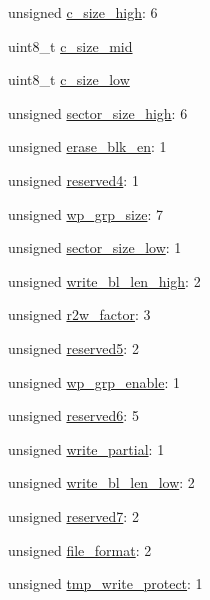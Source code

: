 \begin{DoxyCompactItemize}
\item 
unsigned \hyperlink{struct_c_s_d_v2_a3bfb96cd3f44af64691bc12fbdaf6bbd}{c\+\_\+size\+\_\+high}\+: 6
\item 
uint8\+\_\+t \hyperlink{struct_c_s_d_v2_a7f5abf62601418f93bf7db3e4c44cf17}{c\+\_\+size\+\_\+mid}
\item 
uint8\+\_\+t \hyperlink{struct_c_s_d_v2_aa3717fe7ec52d0336e3729144c15ca3d}{c\+\_\+size\+\_\+low}
\item 
unsigned \hyperlink{struct_c_s_d_v2_aa8630e4c75cd434e0db43b1644b028b4}{sector\+\_\+size\+\_\+high}\+: 6
\item 
unsigned \hyperlink{struct_c_s_d_v2_abd116d457efa09f91c5fad2536718299}{erase\+\_\+blk\+\_\+en}\+: 1
\item 
unsigned \hyperlink{struct_c_s_d_v2_a4f474cd2339283c9a2224eb1259c8e53}{reserved4}\+: 1
\item 
unsigned \hyperlink{struct_c_s_d_v2_afc375bf41f2bffcea61b4a26e95a259a}{wp\+\_\+grp\+\_\+size}\+: 7
\item 
unsigned \hyperlink{struct_c_s_d_v2_a4fbf01ce65824823473004d8507a9682}{sector\+\_\+size\+\_\+low}\+: 1
\item 
unsigned \hyperlink{struct_c_s_d_v2_aa2b4a19a9ee6671b3441636868d2559e}{write\+\_\+bl\+\_\+len\+\_\+high}\+: 2
\item 
unsigned \hyperlink{struct_c_s_d_v2_a58bd5e31a21564370b5321ce744c53cf}{r2w\+\_\+factor}\+: 3
\item 
unsigned \hyperlink{struct_c_s_d_v2_a6beffc3766b7f6cd658e3dad5b7e12f7}{reserved5}\+: 2
\item 
unsigned \hyperlink{struct_c_s_d_v2_a17bbbfe5a1d0da01eeb9dc0e78d1fccc}{wp\+\_\+grp\+\_\+enable}\+: 1
\item 
unsigned \hyperlink{struct_c_s_d_v2_ac401478963e75077602ad0ca9f93c98a}{reserved6}\+: 5
\item 
unsigned \hyperlink{struct_c_s_d_v2_a5bdeb28b6b264d0da4d881881d135c7a}{write\+\_\+partial}\+: 1
\item 
unsigned \hyperlink{struct_c_s_d_v2_a5455039cfbcd62d47d8777326a8332d5}{write\+\_\+bl\+\_\+len\+\_\+low}\+: 2
\item 
unsigned \hyperlink{struct_c_s_d_v2_a10ae8595e043b636b4aeaedcefaa4f97}{reserved7}\+: 2
\item 
unsigned \hyperlink{struct_c_s_d_v2_ac1c316bc9b54c269007fb8e29f635508}{file\+\_\+format}\+: 2
\item 
unsigned \hyperlink{struct_c_s_d_v2_a15af35048d759ff86290222b7ce8e217}{tmp\+\_\+write\+\_\+protect}\+: 1

\end{DoxyCompactItemize}
